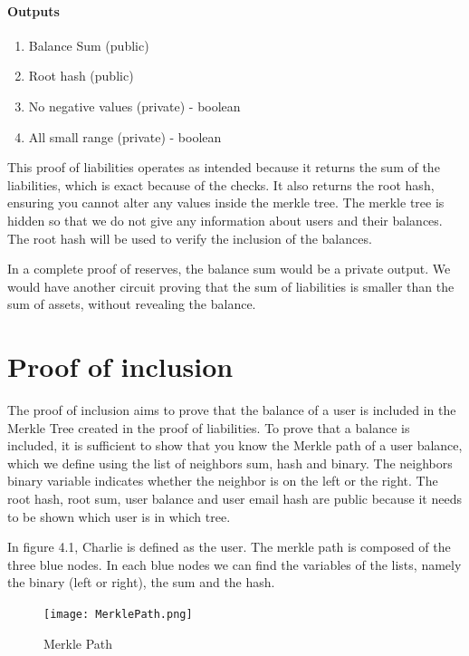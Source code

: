 \paragraph{Outputs}
\begin{enumerate}
   \item Balance Sum (public)
   \item Root hash (public)
   \item No negative values (private) - boolean
   \item All small range (private) - boolean
   \end{enumerate}


This proof of liabilities operates as intended because it returns the sum of the liabilities, which is exact because of the checks.
It also returns the root hash, ensuring you cannot alter any values inside the merkle tree. The merkle tree is hidden so that we do not
give any information about users and their balances.
The root hash will be used to verify the inclusion of the balances.




In a complete proof of reserves, the balance sum would be a private output. We would have another circuit proving that the sum of liabilities is smaller
than the sum of assets, without revealing the balance.




\section{Proof of inclusion}
\label{subsec:pi}
The proof of inclusion aims to prove that the balance of a user is included in the Merkle Tree created in the proof of liabilities.
To prove that a balance is included, it is sufficient to show that you know the Merkle path of a user balance,
which we define using the list of neighbors sum, hash and binary.
The neighbors binary variable indicates whether the neighbor is on the left or the right.
The root hash, root sum, user balance and user email hash are public because it needs to be shown which user is in which tree.


In figure 4.1, Charlie is defined as the user. The merkle path is composed of the three blue nodes. In each blue nodes we can find the variables of the lists,
namely the binary (left or right), the sum and the hash.
\begin{figure}[H]
   \centering
   \texttt{[image: MerklePath.png]}
   \caption{Merkle Path \cite{BM22}}
   \label{overflow}
   \end{figure}


